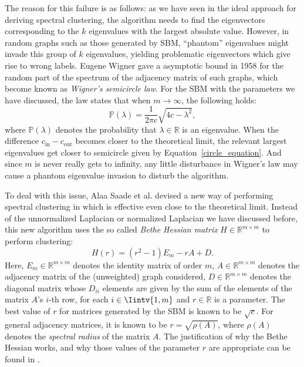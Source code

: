 The reason for this failure is as follows: as we have seen in the ideal approach for deriving spectral clustering, the algorithm needs to find the eigenvectors corresponding to the $k$ eigenvalues with the largest absolute value.
However, in random graphs such as those generated by SBM, ``phantom'' eigenvalues might invade this group of $k$ eigenvalues, yielding problematic eigenvectors which give rise to wrong labels.
Eugene Wigner gave a asymptotic bound in 1958 \cite{circle} for the random part of the spectrum of the adjacency matrix of such graphs, which become known as \textit{Wigner's semicircle law}. 
For the SBM with the parameters we have discussed, the law states that when $m \rightarrow \infty$, the following holds:
\begin{equation} \label{circle_equation}
   \mathbb P (\lambda) = \frac{1}{2 \pi c} \sqrt{4c - \lambda^2},
\end{equation}
where $\mathbb P (\lambda)$ denotes the probability that $\lambda \in \mathbb R$ is an eigenvalue.
When the difference $c_\text{in} - c_\text{out}$ becomes closer to the theoretical limit, the relevant largest eigenvalues get closer to semicircle given by Equation~\vref{circle_equation}.
And since $m$ is never really gets to infinity, any little disturbance in Wigner's law may cause a phantom eigenvalue invasion to disturb the algorithm.

To deal with this issue, Alaa Saade et al. devised a new way of performing spectral clustering in \cite{bethe} which is effective even close to the theoretical limit. 
Instead of the unnormalized Laplacian or normalized Laplacian we have discussed before, this new algorithm uses the so called \textit{Bethe Hessian matrix} $H \in \mathbb R ^{m \times m}$ to perform clustering:
\begin{equation}\label{bethe_definition}
   H(r) = (r^2 - 1) E_m -r A + D.
\end{equation}
Here, $E_m \in \mathbb R^{m \times m}$ denotes the identity matrix of order $m$, $A \in \mathbb R^{m \times m}$ denotes the adjacency matrix of the (unweighted) graph considered, $D \in \mathbb R^{m \times m}$ denotes the diagonal matrix whose $D_{ii}$ elements are given by the sum of the elements of the matrix $A$'s $i$-th row, for each $i \in \Iintv{1,m}$ and $r \in \mathbb R$ is a parameter.
The best value of $r$ for matrices generated by the SBM is known to be $\sqrt{c}$.
For general adjacency matrices, it is known to be $r = \sqrt{\rho {(A)}}$, where $\rho (A)$ denotes the \textit{spectral radius} of the matrix $A$.
The justification of why the Bethe Hessian works, and why those values of the parameter $r$ are appropriate can be found in \cite{bethe}.

